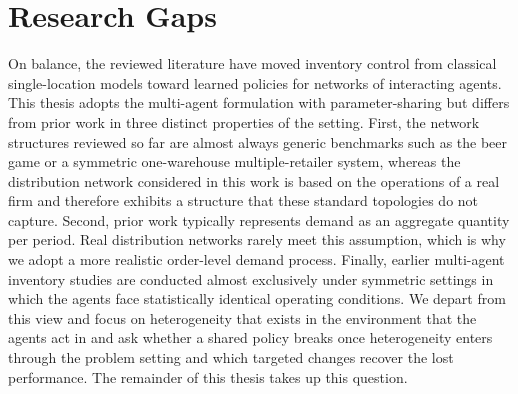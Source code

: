 \section{Research Gaps}
\label{sec:rw-gap}

On balance, the reviewed literature have moved inventory control from classical single-location models toward learned policies for networks of interacting agents.
This thesis adopts the multi-agent formulation with parameter-sharing but differs from prior work in three distinct properties of the setting. First, the network structures reviewed so far are almost always generic benchmarks such as the beer game or a symmetric one-warehouse multiple-retailer system, whereas the distribution network considered in this work is based on the operations of a real firm and therefore exhibits a structure that these standard topologies do not capture. Second, prior work typically represents demand as an aggregate quantity per period. Real distribution networks rarely meet this assumption, which is why we adopt a more realistic order-level demand process. Finally, earlier multi-agent inventory studies are conducted almost exclusively under symmetric settings in which the agents face statistically identical operating conditions. We depart from this view and focus on heterogeneity that exists in the environment that the agents act in and ask whether a shared policy breaks once heterogeneity enters through the problem setting and which targeted changes recover the lost performance. The remainder of this thesis takes up this question.\\